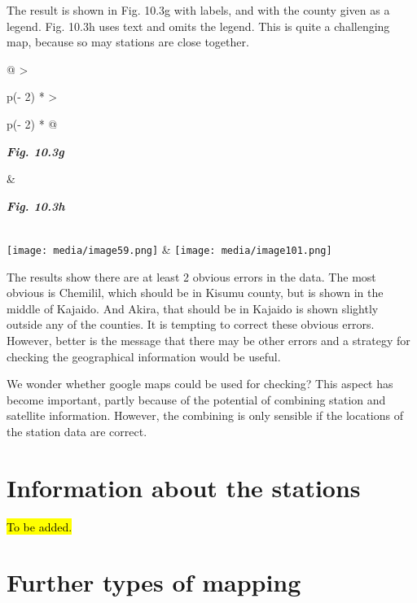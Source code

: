 \documentclass[
  letterpaper,
  DIV=11,
  numbers=noendperiod]{scrreprt}
\begin{document}
The result is shown in Fig. 10.3g with labels, and with the county given
as a legend. Fig. 10.3h uses text and omits the legend. This is quite a
challenging map, because so may stations are close together.

\begin{longtable}[]{@{}
  >{\raggedright\arraybackslash}p{(\columnwidth - 2\tabcolsep) * }
  >{\raggedright\arraybackslash}p{(\columnwidth - 2\tabcolsep) * }@{}}
\toprule\noalign{}
\begin{minipage}[b]{\linewidth}\raggedright
\textbf{\emph{Fig. 10.3g}}
\end{minipage} & \begin{minipage}[b]{\linewidth}\raggedright
\textbf{\emph{Fig. 10.3h}}
\end{minipage} \\
\midrule\noalign{}
\endhead
\bottomrule\noalign{}
\endlastfoot
\texttt{[image: media/image59.png]} &
\texttt{[image: media/image101.png]} \\
\end{longtable}

The results show there are at least 2 obvious errors in the data. The
most obvious is Chemilil, which should be in Kisumu county, but is shown
in the middle of Kajaido. And Akira, that should be in Kajaido is shown
slightly outside any of the counties. It is tempting to correct these
obvious errors. However, better is the message that there may be other
errors and a strategy for checking the geographical information would be
useful.

We wonder whether google maps could be used for checking? This aspect
has become important, partly because of the potential of combining
station and satellite information. However, the combining is only
sensible if the locations of the station data are correct.

\section{Information about the
stations}\label{information-about-the-stations}

\hl{To be added.}

\section{Further types of mapping}\label{further-types-of-mapping}
\end{document}
